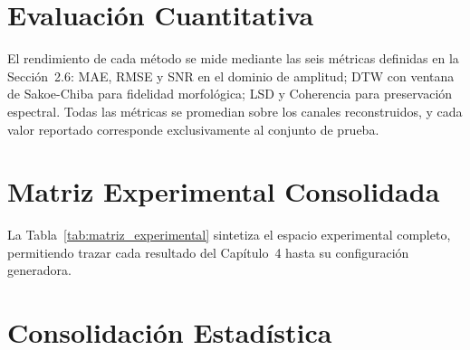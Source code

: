 \section{Evaluación Cuantitativa}

El rendimiento de cada método se mide mediante las seis métricas definidas en la Sección~2.6: MAE, RMSE y SNR en el dominio de amplitud; DTW con ventana de Sakoe-Chiba para fidelidad morfológica; LSD y Coherencia para preservación espectral. Todas las métricas se promedian sobre los canales reconstruidos, y cada valor reportado corresponde exclusivamente al conjunto de prueba.

\section{Matriz Experimental Consolidada}

La Tabla~\ref{tab:matriz_experimental} sintetiza el espacio experimental completo, permitiendo trazar cada resultado del Capítulo~4 hasta su configuración generadora.

\begin{table}[ht]
\centering
\caption{Matriz experimental consolidada. Cada celda representa una combinación evaluada bajo optimización bayesiana con separación cronológica estricta entrenamiento/prueba.}
\label{tab:matriz_experimental}
\end{table}

\section{Consolidación Estadística}

